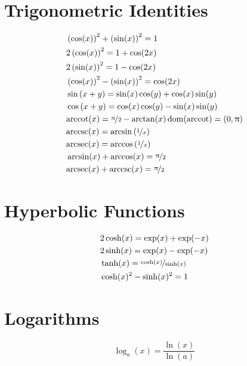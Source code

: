 \documentclass[letterpaper,landscape,9pt,fleqn]{extarticle}
\newcommand{\dom}{\mathrm{dom}}
\newcommand{\arcsec}{\mathrm{arcsec}}
\newcommand{\arccsc}{\mathrm{arccsc}}
\newcommand{\arccot}{\mathrm{arccot}}
\begin{document}
\begin{multicols*}{4}
\section*{Trigonometric Identities}
\vspace{-0.25in}
\begin{minipage}[c]{0.25\textwidth}
\begin{align*}
  &\left(\cos(x)\right)^2 + \left(\sin(x)\right)^2 = 1 \\
  &2 \left(\cos(x)\right)^2 =  1 + \cos(2 x) \\
  &2 \left(\sin(x)\right)^2 = 1 - \cos(2 x) \\
  & \left(\cos (x)\right)^2 - \left(\sin (x) \right)^2 = \cos(2x) \\
   &\sin\left(x +  y\right) =\sin (x) \cos (y) + \cos (x) \sin (y) \\
  &\cos\left(x+y\right)=\cos (x) \cos (y) - \sin (x) \sin (y)    \\
  &\arccot(x) = \nicefrac{\uppi}{2} - \arctan(x) \, \dom(\arccot) = (0,\uppi)\\
  &\arccsc(x) = \arcsin \left (\nicefrac{1}{x} \right ) \\
  &\arcsec(x) = \arccos \left(\nicefrac{1}{x} \right) \\
  & \arcsin (x) + \arccos (x) = \nicefrac{\uppi}{2} \\
    & \arcsec (x) + \arccsc (x) = \nicefrac{\uppi}{2}
  \end{align*}
\end{minipage}

\section*{Hyperbolic Functions}
\vspace{-0.35in}
\begin{align*}
  &2 \cosh(x) = \exp(x) + \exp(-x) \\
  &2 \sinh(x) = \exp(x) - \exp(-x) \\
  & \tanh(x) = \nicefrac{\cosh(x)}{\sinh(x)}\\
  &\cosh(x)^2 - \sinh(x)^2 = 1
\end{align*}

  \section*{Logarithms}
  \vspace{-0.15in}
      \begin{equation*}
    \log_a(x) = \frac{\ln(x)}{\ln(a)}
       \end{equation*}


\end{multicols*}
\end{document}
